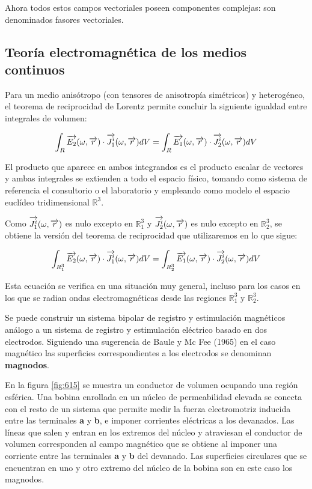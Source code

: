 Ahora todos estos campos vectoriales poseen componentes complejas: son denominados fasores vectoriales.


\subsection{Teoría electromagnética de los medios continuos}

Para un medio anisótropo (con tensores de anisotropía simétricos) y heterogéneo, el teorema de reciprocidad de Lorentz permite concluir la siguiente igualdad entre integrales de volumen:

\begin{equation}
	\int_{R}\overrightarrow{E_{2}}(\omega,\overrightarrow{r}) \cdot \overrightarrow{J_{1}^{i}}(\omega,\overrightarrow{r}) dV = 
	\int_{R}\overrightarrow{E_{1}}(\omega,\overrightarrow{r}) \cdot \overrightarrow{J_{2}^{i}}(\omega,\overrightarrow{r}) dV
\end{equation}

El producto que aparece en ambos integrandos es el producto escalar de vectores y ambas integrales se extienden a todo el espacio físico, tomando como sistema de referencia el consultorio o el laboratorio y empleando como modelo el espacio euclídeo tridimensional ${\mathbb{R}}^{3}$.

Como $\overrightarrow{J_{1}^{i}}(\omega,\overrightarrow{r})$ es nulo excepto en ${\mathbb{R}^{3}_{1}}$ y $\overrightarrow{J_{2}^{i}}(\omega,\overrightarrow{r})$ es nulo excepto en  ${\mathbb{R}^{3}_{2}}$, se obtiene la versión del teorema de reciprocidad que utilizaremos en lo que sigue:

\begin{equation}
	\int_{R^{3}_{1}}\overrightarrow{E_{2}}(\omega,\overrightarrow{r}) \cdot \overrightarrow{J_{1}^{i}}(\omega,\overrightarrow{r}) dV = 
	\int_{R^{3}_{2}}\overrightarrow{E_{1}}(\omega,\overrightarrow{r}) \cdot \overrightarrow{J_{2}^{i}}(\omega,\overrightarrow{r}) dV
\end{equation}

Esta ecuación se verifica en una situación muy general, incluso para los casos en los que se radian ondas electromagnéticas desde las regiones $\mathbb{R}^{3}_{1}$ y $\mathbb{R}^{3}_{2}$.

Se puede construir un sistema bipolar de registro y estimulación magnéticos análogo a un sistema de registro y estimulación eléctrico basado en dos electrodos.
Siguiendo una sugerencia de Baule y Mc Fee (1965) \citep{Baule_1965} en el caso magnético las superficies correspondientes a los electrodos se denominan \textbf{magnodos}.

En la figura \ref{fig:615} se muestra un conductor de volumen ocupando una región esférica.
Una bobina enrollada en un núcleo de permeabilidad elevada se conecta con el resto de un sistema que permite medir la fuerza electromotriz inducida entre las terminales \textbf{a} y \textbf{b}, e imponer corrientes eléctricas a los devanados. Las líneas que salen y entran en los extremos del núcleo y atraviesan el conductor de volumen corresponden al campo magnético que se obtiene al imponer una corriente entre las terminales \textbf{a} y \textbf{b} del devanado.
Las superficies circulares que se encuentran en uno y otro extremo del núcleo de la bobina son en este caso los magnodos.


